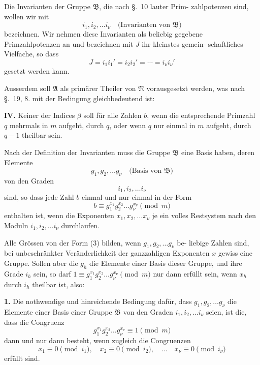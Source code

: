 \documentclass[12pt,a4paper]{article}
\begin{document}
Die Invarianten der Gruppe $\mathfrak{B}$, die nach \S.~10 lauter Prim-
zahlpotenzen sind, wollen wir mit
\[i_1, i_2, \ldots i_\nu \quad \text{(Invarianten von $\mathfrak{B}$)}\]
bezeichnen. Wir nehmen diese Invarianten als beliebig gegebene
Primzahlpotenzen an und bezeichnen mit $J$ ihr kleinstes gemein-
schaftliches Vielfache, so dass
\begin{equation}\label{eq:k21-2}
J = i_1 i_1' = i_2 i_2' = \cdots = i_\nu i_\nu'
\end{equation}
gesetzt werden kann.

Ausserdem soll $\mathfrak{A}$ als primärer Theiler von $\mathfrak{N}$ vorausgesetzt
werden, was nach \S.~19, 8. mit der Bedingung gleichbedeutend ist:

\medskip
\noindent\textbf{IV.} Keiner der Indices $\beta$ soll für alle Zahlen $b$, wenn
die entsprechende Primzahl $q$ mehrmals in $m$
aufgeht, durch $q$, oder wenn $q$ nur einmal in $m$
aufgeht, durch $q-1$ theilbar sein.

Nach der Definition der Invarianten muss die Gruppe $\mathfrak{B}$
eine Basis haben, deren Elemente
\[g_1, g_2, \ldots g_\nu \quad \text{(Basis von $\mathfrak{B}$)}\]
von den Graden
\[i_1, i_2, \ldots i_\nu\]
sind, so dass jede Zahl $b$ einmal und nur einmal in der Form
\begin{equation}\label{eq:k21-3}
b \equiv g_1^{x_1} g_2^{x_2} \ldots g_\nu^{x_\nu} \pmod{m}
\end{equation}
enthalten ist, wenn die Exponenten $x_1, x_2, \ldots x_\nu$ je ein volles
Restsystem nach den Moduln $i_1, i_2, \ldots i_\nu$ durchlaufen.

Alle Grössen von der Form (3) bilden, wenn $g_1, g_2, \ldots g_\nu$ be-
liebige Zahlen sind, bei unbeschränkter Veränderlichkeit der
ganzzahligen Exponenten $x$ gewiss eine Gruppe. Sollen aber
die $g_h$ die Elemente einer Basis dieser Gruppe, und ihre Grade $i_h$
sein, so darf $1 \equiv g_1^{x_1} g_2^{x_2} \ldots g_\nu^{x_\nu} \pmod{m}$ nur dann erfüllt sein,
wenn $x_h$ durch $i_h$ theilbar ist, also:

\medskip
\noindent\textbf{1.} Die nothwendige und hinreichende Bedingung
dafür, dass $g_1, g_2, \ldots g_\nu$ die Elemente einer Basis
einer Gruppe $\mathfrak{B}$ von den Graden $i_1, i_2, \ldots i_\nu$ seien,
ist die, dass die Congruenz
\begin{equation}\label{eq:k21-4}
g_1^{x_1} g_2^{x_2} \ldots g_\nu^{x_\nu} \equiv 1 \pmod{m}
\end{equation}
dann und nur dann besteht, wenn zugleich die
Congruenzen
\begin{equation}\label{eq:k21-5}
x_1 \equiv 0 \pmod{i_1},\quad x_2 \equiv 0 \pmod{i_2},\quad \ldots\quad x_\nu \equiv 0 \pmod{i_\nu}
\end{equation}
erfüllt sind.
\end{document}
